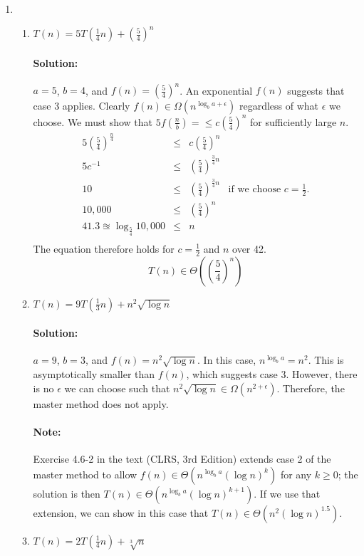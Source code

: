 \documentclass{article}
\begin{document}
\begin{enumerate}
  \pagebreak[2]
\item
  \begin{enumerate}
  \item \(T(n) = 5T(\frac{1}{4}n) + (\frac{5}{4})^n\)
    \paragraph{Solution:}
    \(a=5\), \(b=4\), and \(f(n) = (\frac{5}{4})^n\).  An exponential \(f(n)\)
    suggests that case 3 applies.  Clearly
    \(f(n) \in \Omega(n^{\log_b a + \epsilon})\) regardless of what \(\epsilon\)
    we choose.  We must show that
    \(5f(\frac{n}{b}) = \leq c(\frac{5}{4})^n\) for
    sufficiently large \(n\).
    \[\begin{array}{rcll}
    5(\frac{5}{4})^{\frac{n}{4}} &\leq& c(\frac{5}{4})^n \\
    5c^{-1} &\leq& (\frac{5}{4})^{\frac{3}{4}n} \\
    10 &\leq& (\frac{5}{4})^{\frac{3}{4}n} &
    \mbox{if we choose \(c=\frac{1}{2}\).} \\
    10,000 &\leq& (\frac{5}{4})^n \\
    41.3 \approxeq \log_{\frac{5}{4}} 10,000 &\leq& n \\
    \end{array}\]
    The equation therefore holds for \(c=\frac{1}{2}\) and \(n\) over 42.
    \[T(n) \in \Theta((\frac{5}{4})^n)\]
    \newpage
  \item \(T(n) = 9T(\frac{1}{3}n) + n^2\sqrt{\log n}\)
    \paragraph{Solution:}
    \(a=9\), \(b=3\), and \(f(n) = n^2\sqrt{\log n}\).
    In this case, \(n^{\log_b a}=n^2\).  This is asymptotically smaller than
    \(f(n)\), which suggests case 3.  However, there is no \(\epsilon\) we can
    choose such that \(n^2\sqrt{\log n} \in \Omega(n^{2+\epsilon})\).
    Therefore, the master method does not apply.
    \paragraph{Note:} Exercise 4.6-2 in the text (CLRS, 3rd Edition) extends
    case 2 of the master method to allow
    \(f(n) \in \Theta(n^{\log_b a}(\log n)^k)\) for any \(k\geq 0\); the
    solution is then \(T(n) \in \Theta(n^{\log_b a}(\log n)^{k+1})\).  If we use
    that extension, we can show in this case that
    \(T(n) \in \Theta(n^2(\log n)^{1.5})\).
  \item \(T(n) = 2T(\frac{1}{4}n) + \sqrt[3]{n}\)

\end{enumerate}
\end{enumerate}
\end{document}
